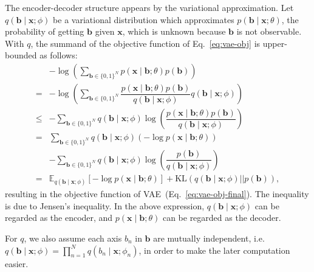 \documentclass[10pt,letterpaper]{article}
\begin{document}
The encoder-decoder structure appears by the variational approximation.
Let $q(\mathbf{b} \mid \mathbf{x};\phi)$ be a variational distribution which approximates $p(\mathbf{b} \mid \mathbf{x};\theta)$, the probability of getting $\mathbf{b}$ given $\mathbf{x}$, which is unknown because $\mathbf{b}$ is not observable.
With $q$, the summand of the objective function of Eq.~\eqref{eq:vae-obj} is upper-bounded as follows:
\begin{align}
\nonumber & - \log \left(\sum_{\mathbf{b}\in\{0,1\}^N} p(\mathbf{x} \mid \mathbf{b};\theta)p(\mathbf{b})\right) \\
\nonumber = & -  \log \left(\sum_{\mathbf{b}\in\{0,1\}^N}\dfrac{p(\mathbf{x} \mid \mathbf{b};\theta) p(\mathbf{b})}{q(\mathbf{b} \mid \mathbf{x}; \phi)}q(\mathbf{b} \mid \mathbf{x}; \phi)\right)\\
\nonumber\leq & - \sum_{\mathbf{b}\in\{0,1\}^N} q(\mathbf{b} \mid \mathbf{x}; \phi)\log \left(\dfrac{p(\mathbf{x} \mid \mathbf{b};\theta) p(\mathbf{b})}{q(\mathbf{b} \mid \mathbf{x}; \phi)}\right)\\
\nonumber =   &   \sum_{\mathbf{b}\in\{0,1\}^N} q(\mathbf{b} \mid \mathbf{x}; \phi) \left(-\log p(\mathbf{x} \mid \mathbf{b};\theta) \right)\\
\nonumber     & - \sum_{\mathbf{b}\in\{0,1\}^N} q(\mathbf{b} \mid \mathbf{x}; \phi)\log \left(\dfrac{p(\mathbf{b})}{q(\mathbf{b} \mid \mathbf{x}; \phi)}\right) \\
\label{eq:vae-obj-final}= & \mathbb{E}_{q(\mathbf{b} \mid \mathbf{x}; \phi)}[-\log p(\mathbf{x} \mid \mathbf{b};\theta)] + \mathrm{KL}(q(\mathbf{b} \mid \mathbf{x}; \phi) || p(\mathbf{b})),
\end{align}
resulting in the objective function of VAE~(Eq.~\eqref{eq:vae-obj-final}).
The inequality is due to Jensen's inequality.
In the above expression, $q(\mathbf{b} \mid \mathbf{x};\phi)$ can be regarded as the encoder, and $p(\mathbf{x}\mid \mathbf{b};\theta)$ can be regarded as the decoder.

For $q$, we also assume each axis $b_n$ in $\mathbf{b}$ are mutually independent, i.e. $q(\mathbf{b} \mid \mathbf{x};\phi)=\prod_{n=1}^N q(b_n \mid \mathbf{x};\phi_n)$,
in order to make the later computation easier.
\end{document}
